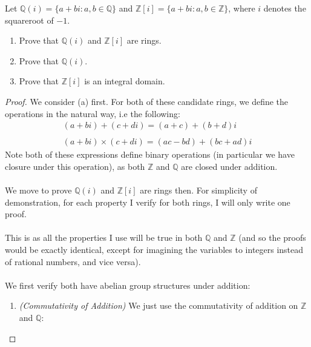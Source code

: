 \documentclass[12pt]{article}
\newenvironment{ex}[2][Exercise]{\begin{trivlist}
\item[\hskip \labelsep {\bfseries #1}\hskip \labelsep {\bfseries #2.}]}{\end{trivlist}}
\newenvironment{sol}[1][Solution]{\begin{trivlist}
\item[\hskip \labelsep {\bfseries #1:}]}{\end{trivlist}}
\begin{document}
\begin{ex}{2}
    Let $\mathbb{Q}(i) = \{a + bi : a, b \in \mathbb{Q}\}$ and $\mathbb{Z}[i] = \{a + bi : a, b \in \mathbb{Z}\}$, where $i$ denotes the squareroot of $-1$.
    \begin{enumerate}[label=(\alph*)]
        \item Prove that $\mathbb{Q}(i)$ and $\mathbb{Z}[i]$ are rings.
        \item Prove that $\mathbb{Q}(i)$.
        \item Prove that $\mathbb{Z}[i]$ is an integral domain.
    \end{enumerate}
\end{ex}
\begin{sol}
    \begin{proof}
        We consider (a) first. For both of these candidate rings, we define the operations in the natural way, i.e the following:
        \begin{equation}
            \begin{aligned}
                (a + bi) + (c + di) = (a + c) + (b + d)i \\ \\ 
                (a + bi) \times (c + di) = (ac - bd) + (bc + ad)i
            \end{aligned}
        \end{equation}
        Note both of these expressions define binary operations (in particular we have closure under this operation), as both $\mathbb{Z}$ and $\mathbb{Q}$ are closed under addition. \\ \\
        We move to prove $\mathbb{Q}(i)$ and $\mathbb{Z}[i]$ are rings then. For simplicity of demonstration, for each property I verify for both rings, I will only write one proof. \\ \\
        This is as all the properties I use will be true in both $\mathbb{Q}$ and $\mathbb{Z}$ (and so the proofs would be exactly identical, except for imagining the variables to integers instead of rational numbers, and vice versa). \\ \\
        We first verify both have abelian group structures under addition:
        \begin{enumerate}
            \item \textit{(Commutativity of Addition)}
            We just use the commutativity of addition on $\mathbb{Z}$ and $\mathbb{Q}$:
            \begin{equation}

\end{equation}
\end{enumerate}
\end{proof}
\end{sol}
\end{document}
